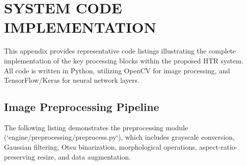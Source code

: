 
\chapter{SYSTEM CODE IMPLEMENTATION}
\label{ch:appendixA}

This appendix provides representative code listings illustrating the complete implementation of the key processing blocks within the proposed HTR system. All code is written in Python, utilizing OpenCV for image processing, and TensorFlow/Keras for neural network layers.

\section{Image Preprocessing Pipeline}
The following listing demonstrates the preprocessing module (`engine/preprocessing/preprocess.py`), which includes grayscale conversion, Gaussian filtering, Otsu binarization, morphological operations, aspect-ratio-preserving resize, and data augmentation.

